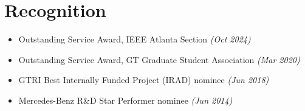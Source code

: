 \documentclass[letterpaper,10.8pt]{article}
\begin{document}
\section{Recognition}
\begin{itemize}[leftmargin=*,itemsep=1pt]
\item Outstanding Service Award, IEEE Atlanta Section \textit{(Oct 2024)}
\item Outstanding Service Award, GT Graduate Student Association \textit{(Mar 2020)}
\item GTRI Best Internally Funded Project (IRAD) nominee \textit{(Jun 2018)}
\item Mercedes-Benz R\&D Star Performer nominee \textit{(Jun 2014)}
\end{itemize}
\end{document}
